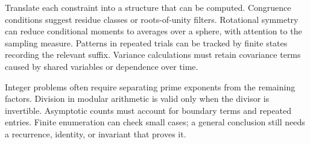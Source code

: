 Translate each constraint into a structure that can be computed. Congruence conditions suggest residue classes or roots-of-unity filters. Rotational symmetry can reduce conditional moments to averages over a sphere, with attention to the sampling measure. Patterns in repeated trials can be tracked by finite states recording the relevant suffix. Variance calculations must retain covariance terms caused by shared variables or dependence over time.

Integer problems often require separating prime exponents from the remaining factors. Division in modular arithmetic is valid only when the divisor is invertible. Asymptotic counts must account for boundary terms and repeated entries. Finite enumeration can check small cases; a general conclusion still needs a recurrence, identity, or invariant that proves it.
\par\smallskip

